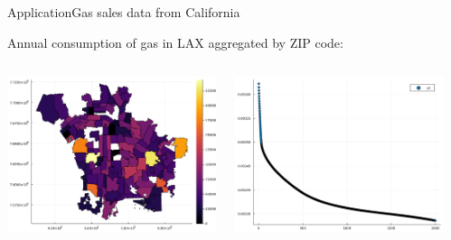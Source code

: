\documentclass[aspectratio=169]{beamer}
\begin{document}
\begin{frame}{Application}{Gas sales data from California}

	Annual consumption of gas in LAX aggregated by ZIP code:

	\vfill
\begin{columns}
	\begin{column}{0.33\textwidth}
		\centering
		\includegraphics[width=\columnwidth]{figuras/real.pdf}		
	\end{column}
	\begin{column}{0.33\textwidth}
		\centering
		\includegraphics[width=\columnwidth]{figuras/loss.pdf}				
	\end{column}
	\begin{column}{0.33\textwidth}

\end{column}
\end{columns}
\end{frame}
\end{document}
